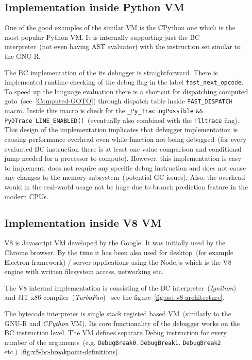 \documentclass[thesis=M,english]{FITthesis}[2018/10/20]
\newcommand{\code}[1]{\texttt{#1}}
\begin{document}
\subsection{Implementation inside Python VM}\label{bcdebug-implementation-in-python}

One of the good examples of the similar VM is the CPython one which is the most popular Python VM. It is internally supporting just the BC interpreter~(not even having AST evaluator) with the instruction set similar to the GNU-R.

The BC implementation of the its debugger is straightforward. There is implemented runtime checking of the debug flag in the label \code{fast{\_}next{\_}opcode}. To speed up the language evaluation there is a shortcut for dispatching computed goto~(see~\ref{Computed-GOTO}) through dispatch table inside \code{FAST{\_}DISPATCH} macro. Inside this macro is check for the \code{{\!}{\_}Py{\_}TracingPossible} \code{{\&\&}} \code{{\!}PyDTrace{\_}LINE{\_}ENABLED()}~(eventually also combined with the \code{!lltrace} flag). This design of the implementation implicates that debugger implementation is causing performance overhead even while function not being debugged~(for every evaluated BC instruction there is at least one value comparison and conditional jump needed for a processor to compute). However, this implementation is easy to implement, does not require any specific debug instruction and does not cause any changes to the memory subsystem~(potential GC issues). Also, the overhead would in the real-world usage not be huge due to branch prediction feature in the modern CPUs.


\subsection{Implementation inside V8 VM}\label{bcdebug-implementation-in-v8}

V8 is Javascript VM developed by the Google. It was initially used by the Chrome browser. By the time it has been also used for desktop~(for example Electron framework) / server applications using the Node.js which is the V8 engine with written filesystem access, networking etc.

The V8 internal implementation is consisting of the BC interpreter~(\textit{Ignition}) and JIT x86 compiler~(\textit{TurboFan})~-see the figure~\ref{fig:ast-v8-architecture}.

The bytecode interpreter is single stack registed based VM~(similarly to the GNU-R and \textit{CPython} VM). Its core functionality of the debugger works on the BC instruction level. The VM defines separate Debug instruction for every number of the arguments~(e.g. \code{DebugBreak0}, \code{DebugBreak1}, \code{DebugBreak2} etc.)~\ref{fig:v8-bc-breakpoint-definitions}.
\end{document}
